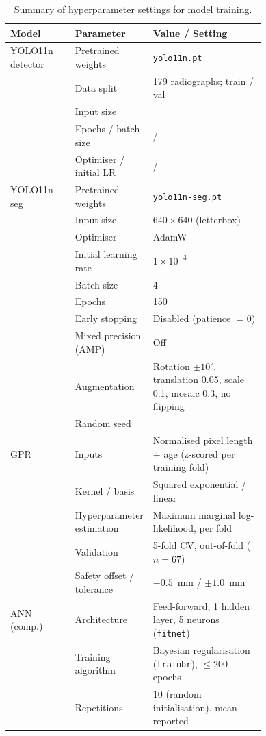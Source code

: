 \begin{table}[t]
\centering
\caption{Summary of hyperparameter settings for model training.}
\label{tab:hyper}
\begin{tabular}{@{}lp{0.30\linewidth}p{0.44\linewidth}@{}}
\toprule
Model & Parameter & Value / Setting \\
\midrule
YOLO11n detector & Pretrained weights  & \texttt{yolo11n.pt} \\
            & Data split                & 179 radiographs; \tbd{} train / \tbd{} val \\
            & Input size                & \tbd{} \\
            & Epochs / batch size       & \tbd{} / \tbd{} \\
            & Optimiser / initial LR    & \tbd{} / \tbd{} \\
\midrule
YOLO11n-seg & Pretrained weights        & \texttt{yolo11n-seg.pt} \\
            & Input size                & $640\times640$ (letterbox) \\
            & Optimiser                 & AdamW \\
            & Initial learning rate     & $1\times10^{-3}$ \\
            & Batch size                & 4 \\
            & Epochs                    & 150 \\
            & Early stopping            & Disabled (patience $=0$) \\
            & Mixed precision (AMP)     & Off \\
            & Augmentation              & Rotation $\pm10^\circ$, translation 0.05, scale 0.1, mosaic 0.3, no flipping \\
            & Random seed               & \tbd{} \\
\midrule
GPR         & Inputs                    & Normalised pixel length + age (z-scored per training fold) \\
            & Kernel / basis            & Squared exponential / linear \\
            & Hyperparameter estimation & Maximum marginal log-likelihood, per fold \\
            & Validation                & 5-fold CV, out-of-fold ($n=67$) \\
            & Safety offset / tolerance & $-0.5$~mm / $\pm1.0$~mm \\
\midrule
ANN (comp.) & Architecture           & Feed-forward, 1 hidden layer, 5 neurons (\texttt{fitnet}) \\
            & Training algorithm        & Bayesian regularisation (\texttt{trainbr}), $\le$200 epochs \\
            & Repetitions               & 10 (random initialisation), mean reported \\
\bottomrule
\end{tabular}
\end{table}

